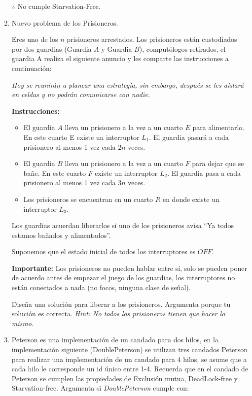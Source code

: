 \begin{enumerate}
    $\therefore$ No cumple Starvation-Free.

    \hfill

    \item Nuevo problema de los Prisioneros.

    Eres uno de los $n$ prisioneros arrestados. Los prisioneros están custodiados por dos guardias (Guardia $A$ y Guardia $B$), computólogos retirados, el guardia A realiza el siguiente anuncio y les comparte las instrucciones a continuación:

    \textit{Hoy se reunirán a planear una estrategia, sin embargo, después se les aislará en celdas y no podrán comunicarse con nadie.}

    \textbf{Instrucciones:}

    \begin{itemize}
        \item El guardia $A$ lleva un prisionero a la vez a un cuarto $E$ para alimentarlo. En este cuarto E existe un interruptor $L_1$. El guardia pasará a cada prisionero al menos 1 vez cada $2n$ veces.

        \item El guardia $B$ lleva un prisionero a la vez a un cuarto $F$ para dejar que se bañe. En este cuarto $F$ existe un interruptor $L_2$. El guardia pasa a cada prisionero al menos 1 vez cada $3n$ veces.
        
        \item Los prisioneros se encuentran en un cuarto $R$ en donde existe un interruptor $L_3$.
    \end{itemize}

    Los guardias acuerdan liberarlos si uno de los prisioneros avisa “Ya todos estamos bañados y alimentados”.
    
    Suponemos que el estado inicial de todos los interruptores es $OFF$.

    \textbf{Importante:} Los prisioneros no pueden hablar entre sí, solo se pueden poner de acuerdo antes de empezar el juego de los guardias, los interruptores no están conectados a nada (no focos, ninguna clase de señal).

    Diseña una solución para liberar a los prisioneros. Argumenta porque tu solución es correcta. \textit{Hint: No todos los prisioneros tienen que hacer lo mismo.}

    \hfill

    \item Peterson es una implementación de un candado para dos hilos, en la implementación siguiente (DoublePeterson) se utilizan tres candados Peterson para realizar una implementación de un candado para 4 hilos, se asume que a cada hilo le corresponde un id único entre 1-4. Recuerda que en el candado de Peterson se cumplen las propiedades de Exclusión mutua, DeadLock-free y Starvation-free. Argumenta si \textit{DoublePeterson} cumple con:


\end{enumerate}
